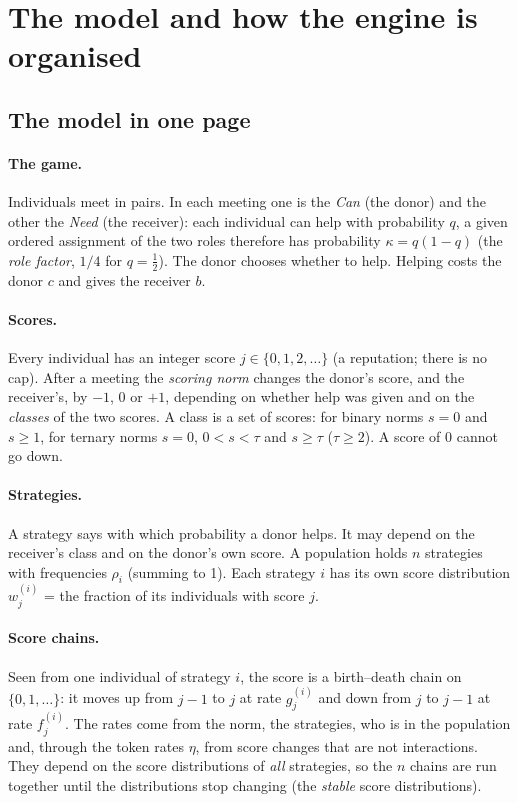 \section{The model and how the engine is organised}

\subsection{The model in one page}

\paragraph{The game.} Individuals meet in pairs. In each meeting one is the \emph{Can} (the donor) and the other the
\emph{Need} (the receiver): each individual can help with probability $q$, a given ordered assignment of the two roles
therefore has probability $\kappa = q(1-q)$ (the \emph{role factor}, $1/4$ for $q=\tfrac12$). The donor chooses whether to
help. Helping costs the donor $c$ and gives the receiver $b$.

\paragraph{Scores.} Every individual has an integer score $j\in\{0,1,2,\dots\}$ (a reputation; there is no cap).
After a meeting the \emph{scoring norm} changes the donor's score, and the receiver's, by $-1$, $0$ or $+1$, depending on
whether help was given and on the \emph{classes} of the two scores. A class is a set of scores: for binary norms
$s=0$ and $s\ge 1$, for ternary norms $s=0$, $0<s<\tau$ and $s\ge\tau$ ($\tau\ge2$). A score of $0$ cannot go down.

\paragraph{Strategies.} A strategy says with which probability a donor helps. It may depend on the receiver's class
and on the donor's own score. A population holds $n$ strategies with frequencies $\rho_i$ (summing to 1). Each strategy
$i$ has its own score distribution $w^{(i)}_j$ = the fraction of its individuals with score $j$.

\paragraph{Score chains.} Seen from one individual of strategy $i$, the score is a birth--death chain on $\{0,1,\dots\}$:
it moves up from $j-1$ to $j$ at rate $g^{(i)}_j$ and down from $j$ to $j-1$ at rate $f^{(i)}_j$. The rates come from
the norm, the strategies, who is in the population and, through the token rates $\eta$, from score changes that are not interactions. They
depend on the score distributions of \emph{all} strategies, so the $n$ chains are run together until the distributions
stop changing (the \emph{stable} score distributions).

